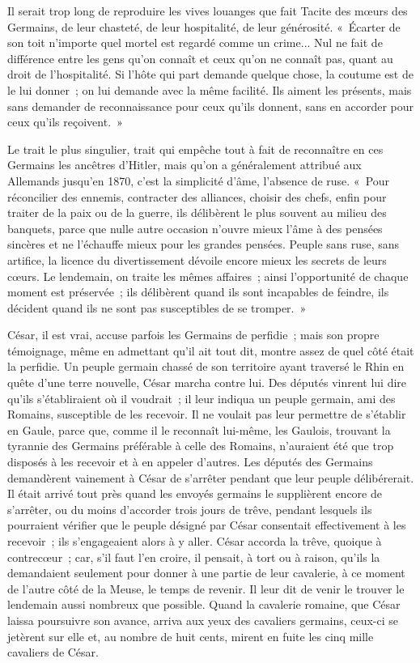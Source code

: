\documentclass[french,twoside]{book} %
\begin{document}
Il serait trop long de reproduire les vives louanges que fait Tacite des mœurs des Germains, de leur chasteté, de leur hospitalité, de leur générosité. « Écarter de son toit n'importe quel mortel est regardé comme un crime... Nul ne fait de différence entre les gens qu'on connaît et ceux qu'on ne connaît pas, quant au droit de l'hospitalité. Si l'hôte qui part demande quelque chose, la coutume est de le lui donner ; on lui demande avec la même facilité. Ils aiment les présents, mais sans demander de reconnaissance pour ceux qu'ils donnent, sans en accorder pour ceux qu'ils reçoivent. »\par
Le trait le plus singulier, trait qui empêche tout à fait de reconnaître en ces Germains les ancêtres d'Hitler, mais qu'on a généralement attribué aux Allemands jusqu'en 1870, c'est la simplicité d'âme, l'absence de ruse. « Pour réconcilier des ennemis, contracter des alliances, choisir des chefs, enfin pour traiter de la paix ou de la guerre, ils délibèrent le plus souvent au milieu des banquets, parce que nulle autre occasion n'ouvre mieux l'âme à des pensées sincères et ne l'échauffe mieux pour les grandes pensées. Peuple sans ruse, sans artifice, la licence du divertissement dévoile encore mieux les secrets de leurs cœurs. Le lendemain, on traite les mêmes affaires ; ainsi l'opportunité de chaque moment est préservée ; ils délibèrent quand ils sont incapables de feindre, ils décident quand ils ne sont pas susceptibles de se tromper. »\par
César, il est vrai, accuse parfois les Germains de perfidie ; mais son propre témoignage, même en admettant qu'il ait tout dit, montre assez de quel côté était la perfidie. Un peuple germain chassé de son territoire ayant traversé le Rhin en quête d'une terre nouvelle, César marcha contre lui. Des députés vinrent lui dire qu'ils s'établiraient où il voudrait ; il leur indiqua un peuple germain, ami des Romains, susceptible de les recevoir. Il ne voulait pas leur permettre de s'établir en Gaule, parce que, comme il le reconnaît lui-même, les Gaulois, trouvant la tyrannie des Germains préférable à celle des Romains, n'auraient été que trop disposés à les recevoir et à en appeler d'autres. Les députés des Germains demandèrent vainement à César de s'arrêter pendant que leur peuple délibérerait. Il était arrivé tout près quand les envoyés ger­mains le supplièrent encore de s'arrêter, ou du moins d'accorder trois jours de trêve, pendant lesquels ils pourraient vérifier que le peuple désigné par César consentait effectivement à les recevoir ; ils s'engageaient alors à y aller. César accorda la trêve, quoique à contrecœur ; car, s'il faut l'en croire, il pensait, à tort ou à raison, qu'ils la demandaient seulement pour donner à une partie de leur cavalerie, à ce moment de l'autre côté de la Meuse, le temps de revenir. Il leur dit de venir le trouver le lendemain aussi nombreux que possible. Quand la cavalerie romaine, que César laissa poursuivre son avance, arriva aux yeux des cavaliers germains, ceux-ci se jetèrent sur elle et, au nombre de huit cents, mirent en fuite les cinq mille cavaliers de César.\par
\end{document}
